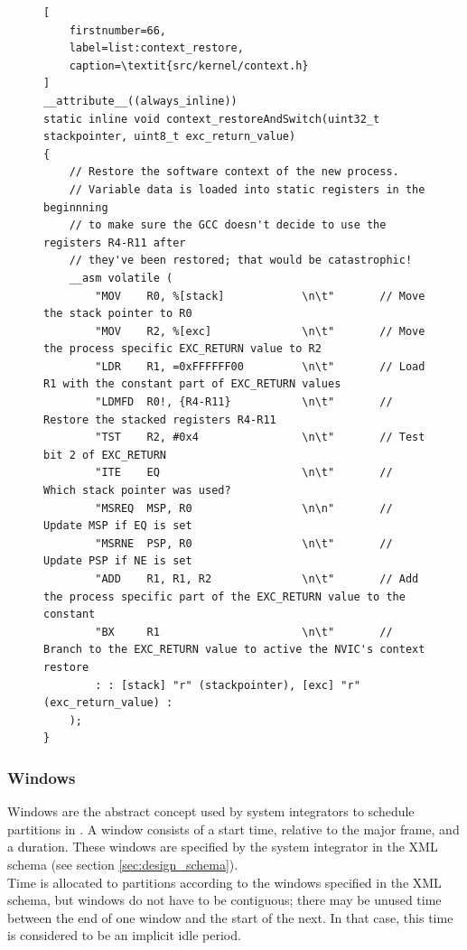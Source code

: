 \begin{figure}[H]
\lstset{
	language=C,
	basicstyle=\footnotesize,
	showspaces=false,
	showtabs=false,
	showstringspaces=false,
	tabsize=4,
	breaklines=true
}
\begin{lstlisting}[
	firstnumber=66,
	label=list:context_restore,
	caption=\textit{src/kernel/context.h}
]
__attribute__((always_inline))
static inline void context_restoreAndSwitch(uint32_t stackpointer, uint8_t exc_return_value)
{
    // Restore the software context of the new process.
    // Variable data is loaded into static registers in the beginnning
    // to make sure the GCC doesn't decide to use the registers R4-R11 after
    // they've been restored; that would be catastrophic!
    __asm volatile (
        "MOV	R0, %[stack]			\n\t"		// Move the stack pointer to R0
        "MOV	R2, %[exc]				\n\t"		// Move the process specific EXC_RETURN value to R2
        "LDR	R1, =0xFFFFFF00 		\n\t"		// Load R1 with the constant part of EXC_RETURN values
        "LDMFD  R0!, {R4-R11}     		\n\t"		// Restore the stacked registers R4-R11
        "TST	R2, #0x4    			\n\t"		// Test bit 2 of EXC_RETURN
        "ITE	EQ      				\n\t"		// Which stack pointer was used?
        "MSREQ	MSP, R0		 			\n\n"		// Update MSP if EQ is set
        "MSRNE 	PSP, R0					\n\t"		// Update PSP if NE is set
        "ADD	R1, R1, R2				\n\t"		// Add the process specific part of the EXC_RETURN value to the constant
        "BX		R1						\n\t"		// Branch to the EXC_RETURN value to active the NVIC's context restore
        : : [stack] "r" (stackpointer), [exc] "r" (exc_return_value) :
    );
}
\end{lstlisting}
\end{figure}


\subsubsection{Windows}
\label{sssec:impl_windows}
Windows are the abstract concept used by system integrators to schedule
partitions in \arinc . A window consists of a start time, relative to the major
frame, and a duration. These windows are specified by the system integrator in
the XML schema (see section \ref{sec:design_schema}).\\
Time is allocated to partitions according to the windows specified in the XML
schema, but windows do not have to be contiguous; there may be unused time
between the end of one window and the start of the next. In that case, this time
is considered to be an implicit idle period.\\

